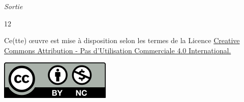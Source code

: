 \documentclass[11pt,french]{article}
\makeatletter
\def\maxwidth{\ifdim\Gin@nat@width>\linewidth\linewidth
    \else\Gin@nat@width\fi}
\let\Oldincludegraphics\includegraphics
\renewcommand{\includegraphics}[1]{\Oldincludegraphics[width=.8\maxwidth]{#1}}
\newenvironment{Shaded}{}{}
\newcommand{\DecValTok}[1]{\textcolor[rgb]{0.25,0.63,0.44}{{#1}}}
\makeatother
\begin{document}
\emph{Sortie}

\begin{Shaded}
\begin{Highlighting}[]
\DecValTok{12}
\end{Highlighting}
\end{Shaded}

\vspace{1.5cm} 
 Ce(tte) œuvre est mise à disposition selon les termes de la Licence
\href{https://creativecommons.org/licenses/by-nc/4.0/}{Creative Commons Attribution - Pas d'Utilisation Commerciale 4.0
International.}
\begin{center}
\includegraphics{Cc-by-nc_icon.svg.png}
\end{center}
    
    
    
    
\end{document}
